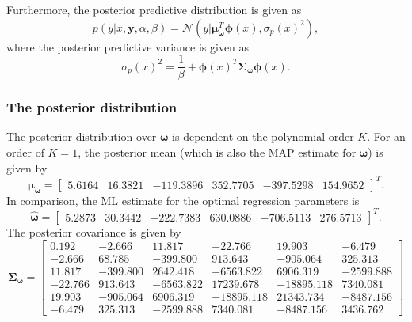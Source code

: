 \documentclass{article}
\begin{document}
Furthermore, the posterior predictive distribution is given as
\begin{equation}\label{eq:Q2_post_predict}
p(y \vert x, \mathbf{y}, \alpha, \beta) = \mathcal{N}(y \vert \boldsymbol\mu^{T}_{\boldsymbol\omega} \boldsymbol\phi(x), \sigma_p(x)^2),
\end{equation}
where the posterior predictive variance is given as
\begin{equation}
\sigma_p(x)^2 = \frac{1}{\beta} + \boldsymbol\phi(x)^T \boldsymbol\Sigma_{\boldsymbol\omega}\boldsymbol\phi(x).
\end{equation}

\subsubsection*{The posterior distribution}
The posterior distribution over $\boldsymbol\omega$ is dependent on the polynomial order $K$. For an order of $K = 1$, the posterior mean (which is also the MAP estimate for $\boldsymbol\omega$) is given by
\begin{equation}
\boldsymbol\mu_{\boldsymbol\omega} = 
\begin{bmatrix}
5.6164 & 16.3821 & -119.3896 & 352.7705 & -397.5298 & 154.9652
\end{bmatrix}^T.
\end{equation}
In comparison, the ML estimate for the optimal regression parameters is
\begin{equation}
\hat{\boldsymbol\omega} = 
\begin{bmatrix}
5.2873 & 30.3442 & -222.7383 & 630.0886 & -706.5113 & 276.5713
\end{bmatrix}^T.
\end{equation}
The posterior covariance is given by
\begin{equation}
\boldsymbol\Sigma_{\boldsymbol\omega} = 
\begin{bmatrix}
 0.192 & -2.666 & 11.817 & -22.766 &  19.903 & -6.479 \\
-2.666 & 68.785 & -399.800 & 913.643 & -905.064 &  325.313  \\
11.817 & -399.800 & 2642.418 & -6563.822 & 6906.319 & -2599.888 \\
-22.766 & 913.643 & -6563.822 & 17239.678 & -18895.118 & 7340.081 \\
19.903 & -905.064 & 6906.319 & -18895.118 & 21343.734 & -8487.156 \\
-6.479 & 325.313 & -2599.888 & 7340.081 & -8487.156 & 3436.762
\end{bmatrix}
\end{equation}
\end{document}
